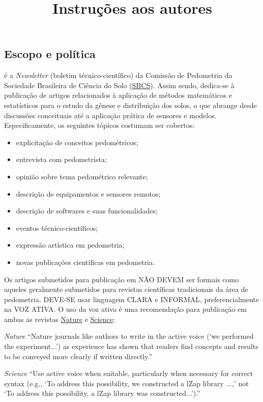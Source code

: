 \title{Instruções aos autores}
\maketitle

\subsection{Escopo e política}

\pedometria{} é a \textit{Newsletter} (boletim técnico-científico) da Comissão de Pedometria da Sociedade Brasileira de Ciência do Solo (\href{http://www.sbcs.org.br/}{SBCS}). Assim sendo, dedica-se à publicação de artigos relacionados à aplicação de métodos matemáticos e estatísticos para o estudo da gênese e distribuição dos solos, o que abrange desde discussões conceituais até a aplicação prática de sensores e modelos. Especificamente, os seguintes tópicos costumam ser cobertos:

\begin{itemize}
 \item explicitação de conceitos pedométricos;
 \item entrevista com pedometrista;
 \item opinião sobre tema pedométrico relevante;
 \item descrição de equipamentos e sensores remotos;
 \item descrição de softwares e suas funcionalidades;
 \item eventos técnico-científicos;
 \item expressão artística em pedometria;
 \item novas publicações científicas em pedometria.
\end{itemize}

Os artigos submetidos para publicação em \pedometria{} NÃO DEVEM ser formais como aqueles geralmente submetidos para revistas científicas tradicionais da área de pedometria. DEVE-SE usar linguagem CLARA e INFORMAL, preferencialmente na VOZ ATIVA. O uso da voz ativa é uma recomendação para publicação em ambas as revistas \href{http://www.nature.com/nature/authors/gta/}{Nature} e \href{http://www.sciencemag.org/about/authors}{Science}:

\begin{description}
 \item \textit{Nature} ``Nature journals like authors to write in the active voice (`we performed the experiment...') as experience has shown that readers find concepts and results to be conveyed more clearly if written directly.''
 \item \textit{Science} ``Use active voice when suitable, particularly when necessary for correct syntax (e.g., `To address this possibility, we constructed a lZap library ...,' not `To address this possibility, a lZap library was constructed...').''
\end{description}

